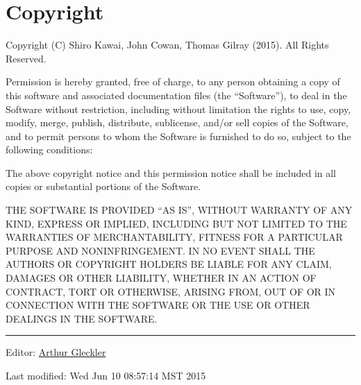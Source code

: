 \section{Copyright}\label{copyright}

Copyright (C) Shiro Kawai, John Cowan, Thomas Gilray (2015). All Rights
Reserved.

Permission is hereby granted, free of charge, to any person obtaining a
copy of this software and associated documentation files (the
``Software''), to deal in the Software without restriction, including
without limitation the rights to use, copy, modify, merge, publish,
distribute, sublicense, and/or sell copies of the Software, and to
permit persons to whom the Software is furnished to do so, subject to
the following conditions:

The above copyright notice and this permission notice shall be included
in all copies or substantial portions of the Software.

THE SOFTWARE IS PROVIDED ``AS IS'', WITHOUT WARRANTY OF ANY KIND,
EXPRESS OR IMPLIED, INCLUDING BUT NOT LIMITED TO THE WARRANTIES OF
MERCHANTABILITY, FITNESS FOR A PARTICULAR PURPOSE AND NONINFRINGEMENT.
IN NO EVENT SHALL THE AUTHORS OR COPYRIGHT HOLDERS BE LIABLE FOR ANY
CLAIM, DAMAGES OR OTHER LIABILITY, WHETHER IN AN ACTION OF CONTRACT,
TORT OR OTHERWISE, ARISING FROM, OUT OF OR IN CONNECTION WITH THE
SOFTWARE OR THE USE OR OTHER DEALINGS IN THE SOFTWARE.

\begin{center}\rule{0.5\linewidth}{\linethickness}\end{center}

Editor:
\href{mailto:srfi-editors\%20at\%20srfi\%20dot\%20schemers\%20\%20\%20\%20dot\%20org}{Arthur
Gleckler}

Last modified: Wed Jun 10 08:57:14 MST 2015
